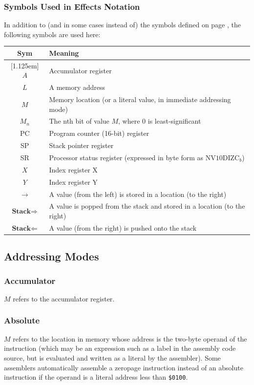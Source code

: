 \documentclass[12pt]{{memoir}}
\newcommand\Hline{%
\hline\raisebox{0pt}[1.125em]{}}
\begin{document}
\subsubsection{Symbols Used in Effects Notation}

In addition to (and in some cases instead of) the symbols defined on page \pageref{mathsym}, the following symbols are used here:

\begin{center}\begin{tabular}{cl}
Sym & Meaning \\
\Hline
$A$ & Accumulator register \\
$L$ & A memory address \\
$M$ & Memory location (or a literal value, in immediate addressing mode) \\
$M_n$ & The nth bit of value $M$, where 0 is least-significant \\
PC & Program counter (16-bit) register \\
SP & Stack pointer register \\
SR & Processor status register (expressed in byte form as $\mathrm{NV10DIZC}_b$) \\
$X$ & Index register X \\
$Y$ & Index register Y \\
$\to$ & A value (from the left) is stored in a location (to the right) \\
$\textbf{Stack} \Rightarrow$ & A value is popped from the stack and stored in a location (to the right) \\
$\textbf{Stack} \Leftarrow$ & A value (from the right) is pushed onto the stack \\
\end{tabular}\end{center}

\subsection{Addressing Modes}
\newcommand\pbf{\textsuperscript{\ref{idxpagebdyfootnote}}}

\subsubsection{Accumulator}
$M$ refers to the accumulator register.

\subsubsection{Absolute}
$M$ refers to the location in memory whose address is the two-byte operand of the instruction (which may be an expression such as a label in the assembly code source, but is evaluated and written as a literal by the assembler). Some assemblers automatically assemble a zeropage instruction instead of an absolute instruction if the operand is a literal address less than \texttt{\$0100}.
\end{document}

